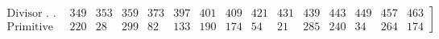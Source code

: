 \par\begingroup\small\setlength{\arraycolsep}{1.4pt}
\[\left.\begin{array}{l*{14}{r}}
\text{Divisor . . . . . } & 349 & 353 & 359 & 373 & 397 & 401 & 409 & 421 & 431 & 439 & 443 & 449 & 457 & 463\\
\text{Primitive root . .} & 220 & 28 & 299 & 82 & 133 & 190 & 174 & 54 & 21 & 285 & 240 & 34 & 264 & 174
\end{array}\right]\]
\endgroup

\par\endgroup
